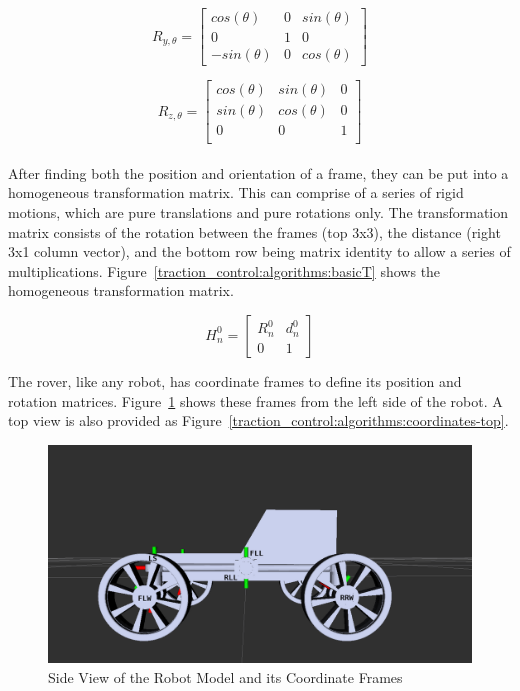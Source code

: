 \begin{equation}
	R_{y,\theta} = \left[\begin{array}{ccc}
		cos(\theta) & 0 & sin(\theta) \\
		0 & 1 & 0 \\
		-sin(\theta) & 0 & cos(\theta) 
	\end{array}\right]
	\label{traction_control:algorithms:ry}
\end{equation}

\begin{equation}
	R_{z,\theta} = \left[\begin{array}{ccc}
		cos(\theta) & sin(\theta) & 0 \\
		sin(\theta) & cos(\theta) & 0 \\
		0 & 0 & 1 \\
	 
	\end{array}\right]
	\label{traction_control:algorithms:rz}
\end{equation}\\

After finding both the position and orientation of a frame, they can be put into a homogeneous transformation matrix. This can comprise of a series of rigid motions, which are pure translations and pure rotations only. The transformation matrix consists of the rotation between the frames (top 3x3), the distance (right 3x1 column vector), and the bottom row being matrix identity to allow a series of multiplications. Figure~\ref{traction_control:algorithms:basicT} shows the homogeneous transformation matrix. 

\begin{equation}
	H^{0}_{n} = \left[\begin{array}{cc}
			R^{0}_{n} & d^{0}_{n}\\
			0 & 1 
			\end{array}\right]
		\label{traction_control:algorithms:basicT}
\end{equation}


The rover, like any robot, has coordinate frames to define its position and rotation matrices.
 Figure~\ref{traction_control:algorithms:coordinates-side} shows these frames from the left side of the robot. A top view is also provided as Figure~\ref{traction_control:algorithms:coordinates-top}.

\begin{figure}[H]
	\centering
	\includegraphics[scale=0.35, width=.7\textwidth]{sections/algorithms/images/srr_side.png}
	\caption{Side View of the Robot Model and its Coordinate Frames}
	\label{traction_control:algorithms:coordinates-side}
\end{figure}
 
